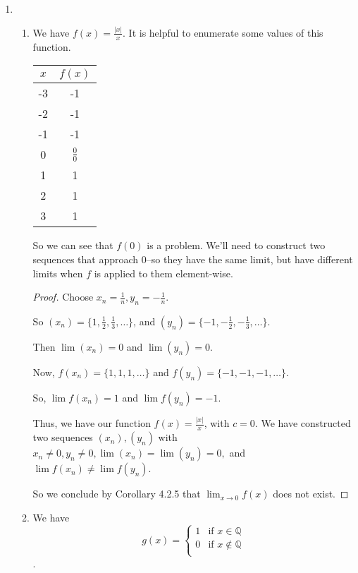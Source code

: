 \documentclass[12pt,letterpaper]{article}
\begin{document}
\begin{enumerate}[label=Exercise 4.2.\arabic*]
    \item
      \begin{enumerate}
        \item
          We have $f(x) = \frac{\left|x\right|}{x}$.
          It is helpful to enumerate some values of this function.
          \begin{tabular}{c | c}
            $x$ & $f(x)$ \\
            \hline
            -3 & -1 \\
            -2 & -1 \\
            -1 & -1 \\
             0 & $\frac{0}{0}$ \\
             1 & 1 \\
             2 & 1 \\
             3 & 1 \\
          \end{tabular}

          So we can see that $f(0)$ is a problem.
          We'll need to construct two sequences that approach 0--so they have the same limit,
          but have different limits when $f$ is applied to them element-wise.

          \begin{proof}
            Choose $x_n = \frac{1}{n}, y_n = -\frac{1}{n}$.

            So $(x_n) = \{1, \frac{1}{2}, \frac{1}{3}, \dots\}$,
            and $(y_n) = \{-1, -\frac{1}{2}, -\frac{1}{3}, \dots\}$.

            Then $\lim(x_n) = 0$ and $\lim(y_n) = 0$.

            Now, $f(x_n) = \{1, 1, 1, \dots\}$ and $f(y_n) = \{-1, -1, -1, \dots\}$.

            So,  $\lim f(x_n) = 1$ and $\lim f(y_n) = -1$.

            Thus,
            we have our function $f(x) = \frac{\left|x\right|}{x}$,
            with $c = 0$.
            We have constructed two sequences $(x_n), (y_n)$
            with $x_n \ne 0, y_n \ne 0, \lim(x_n) = \lim(y_n) = 0,$
            and $\lim f(x_n) \ne \lim f(y_n)$.

            So we conclude by Corollary 4.2.5 that $\lim_{x \to 0} f(x)$ does not exist.
          \end{proof}
        \item
          We have
          \[
            g(x) =
            \begin{cases}
              1 & \text{if } x \in \mathbb{Q} \\
              0 & \text{if } x \notin \mathbb{Q} \\
            \end{cases}
          \].


\end{enumerate}
\end{enumerate}
\end{document}
